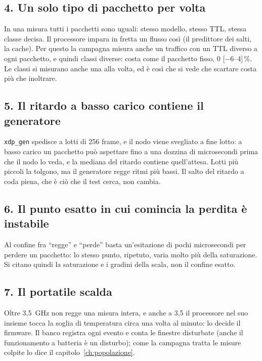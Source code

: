 \documentclass[11pt,a4paper,oneside]{report}
\begin{document}
\subsection*{4. Un solo tipo di pacchetto per volta}

In una misura tutti i pacchetti sono uguali: stesso modello, stesso TTL, stessa
classe decisa. Il processore impara in fretta un flusso così (il predittore dei
salti, la cache). Per questo la campagna misura anche un traffico con un TTL
diverso a ogni pacchetto, e quindi classi diverse: costa come il pacchetto fisso,
0 [$-6$--4]\,\%. Le classi si misurano anche una alla volta, ed è così che si
vede che scartare costa più che inoltrare.

\subsection*{5. Il ritardo a basso carico contiene il generatore}

\texttt{xdp\_gen} spedisce a lotti di 256 frame, e il nodo viene svegliato a fine
lotto: a basso carico un pacchetto può aspettare fino a una dozzina di
microsecondi prima che il nodo lo veda, e la mediana del ritardo contiene
quell'attesa. Lotti più piccoli la tolgono, ma il generatore
regge ritmi più bassi. Il salto del ritardo a coda piena, che è ciò che il test
cerca, non cambia.

\subsection*{6. Il punto esatto in cui comincia la perdita è instabile}

Al confine fra ``regge'' e ``perde'' basta un'esitazione di pochi microsecondi per
perdere un pacchetto: lo stesso punto, ripetuto, varia molto più della
saturazione. Si citano quindi la saturazione e i gradini della
scala, non il confine esatto.

\subsection*{7. Il portatile scalda}

Oltre 3,5~GHz non regge una misura intera, e anche a 3,5 il processore nel
suo insieme tocca la soglia di temperatura circa una volta al minuto: lo decide
il firmware. Il banco registra ogni evento e conta le finestre disturbate (anche
il funzionamento a batteria è un disturbo); come la campagna tratta le misure
colpite lo dice il capitolo~\ref{ch:popolazione}.
\end{document}
